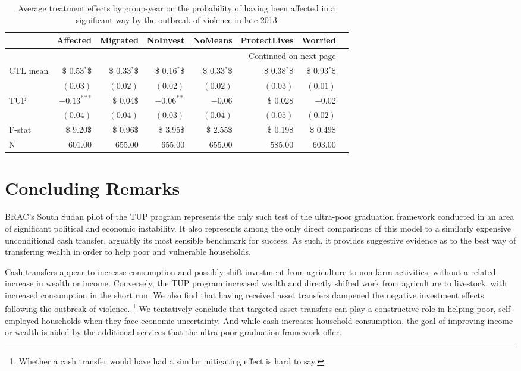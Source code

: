 \documentclass[12pt,article]{article}
\begin{document}
\begin{longtable}{lrrrrrrr}
\caption{\label{tab:Income}Average treatment effects by group-year on the probability of having been affected in a significant way by the outbreak of violence in late 2013}
\\
\hline
 & Affected & Migrated & NoInvest & NoMeans & ProtectLives & Worried\\
\hline
\endhead
\hline\multicolumn{7}{r}{Continued on next page} \\
\endfoot
\endlastfoot
CTL mean & \$ 0.53$^{\textbf{*}}$\$ & \$ 0.33$^{\textbf{*}}$\$ & \$ 0.16$^{\textbf{*}}$\$ & \$ 0.33$^{\textbf{*}}$\$ & \$ 0.38$^{\textbf{*}}$\$ & \$ 0.93$^{\textbf{*}}$\$\\
 & $( 0.03)$ & $( 0.02)$ & $( 0.02)$ & $( 0.02)$ & $( 0.03)$ & $( 0.01)$\\
TUP & $-0.13^{***}$ & \$ 0.04\$ & $-0.06^{**}$ & $-0.06$ & \$ 0.02\$ & $-0.02$\\
 & $( 0.04)$ & $( 0.04)$ & $( 0.03)$ & $( 0.04)$ & $( 0.05)$ & $( 0.02)$\\
\hline
F-stat & \$ 9.20\$ & \$ 0.96\$ & \$ 3.95\$ & \$ 2.55\$ & \$ 0.19\$ & \$ 0.49\$\\
N & $601.00$ & $655.00$ & $655.00$ & $655.00$ & $585.00$ & $603.00$\\
\hline
\end{longtable}

\newpage
\section{Concluding Remarks}
\label{sec-4}

BRAC's South Sudan pilot of the TUP program represents the only such test of the
ultra-poor graduation framework conducted in an area of significant political and
economic instability. It also represents among the only direct comparisons of this
model to a similarly expensive unconditional cash transfer, arguably its most
sensible benchmark for success. As such, it provides suggestive evidence as to the
best way of transfering wealth in order to help poor and vulnerable households.

Cash transfers appear to increase consumption and possibly shift investment from
agriculture to non-farm activities, without a related increase in wealth or income.
Conversely, the TUP program increased wealth and directly shifted work from
agriculture to livestock, with increased consumption in the short run. We also find
that having received asset transfers dampened the negative investment effects
following the outbreak of violence. \footnote{Whether a cash transfer would have had a
similar mitigating effect is hard to say.} We tentatively conclude that targeted
asset transfers can play a constructive role in helping poor, self-employed
households when they face economic uncertainty. And while cash increases household
consumption, the goal of improving income or wealth is aided by the additional
services that the ultra-poor graduation framework offer.
\end{document}
